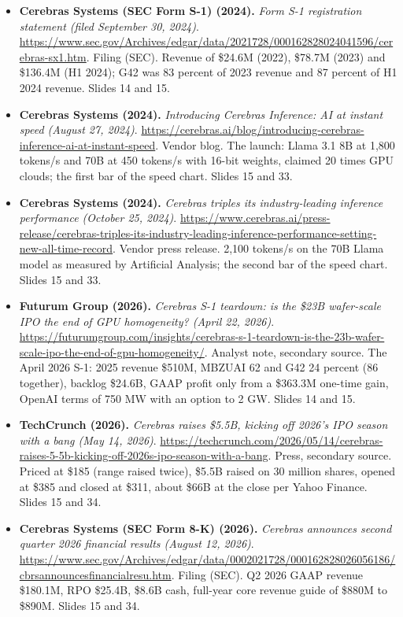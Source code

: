 \documentclass[11pt,letterpaper]{article}
\begin{document}
\begin{itemize}[leftmargin=1.2em,itemsep=3pt]
\item \textbf{Cerebras Systems (SEC Form S-1) (2024).} \textit{Form S-1 registration statement (filed September 30, 2024)}. \url{https://www.sec.gov/Archives/edgar/data/2021728/000162828024041596/cerebras-sx1.htm}. Filing (SEC). Revenue of \$24.6M (2022), \$78.7M (2023) and \$136.4M (H1 2024); G42 was 83 percent of 2023 revenue and 87 percent of H1 2024 revenue. Slides 14 and 15.
\item \textbf{Cerebras Systems (2024).} \textit{Introducing Cerebras Inference: AI at instant speed (August 27, 2024)}. \url{https://cerebras.ai/blog/introducing-cerebras-inference-ai-at-instant-speed}. Vendor blog. The launch: Llama 3.1 8B at 1,800 tokens/s and 70B at 450 tokens/s with 16-bit weights, claimed 20 times GPU clouds; the first bar of the speed chart. Slides 15 and 33.
\item \textbf{Cerebras Systems (2024).} \textit{Cerebras triples its industry-leading inference performance (October 25, 2024)}. \url{https://www.cerebras.ai/press-release/cerebras-triples-its-industry-leading-inference-performance-setting-new-all-time-record}. Vendor press release. 2,100 tokens/s on the 70B Llama model as measured by Artificial Analysis; the second bar of the speed chart. Slides 15 and 33.
\item \textbf{Futurum Group (2026).} \textit{Cerebras S-1 teardown: is the \$23B wafer-scale IPO the end of GPU homogeneity? (April 22, 2026)}. \url{https://futurumgroup.com/insights/cerebras-s-1-teardown-is-the-23b-wafer-scale-ipo-the-end-of-gpu-homogeneity/}. Analyst note, secondary source. The April 2026 S-1: 2025 revenue \$510M, MBZUAI 62 and G42 24 percent (86 together), backlog \$24.6B, GAAP profit only from a \$363.3M one-time gain, OpenAI terms of 750 MW with an option to 2 GW. Slides 14 and 15.
\item \textbf{TechCrunch (2026).} \textit{Cerebras raises \$5.5B, kicking off 2026's IPO season with a bang (May 14, 2026)}. \url{https://techcrunch.com/2026/05/14/cerebras-raises-5-5b-kicking-off-2026s-ipo-season-with-a-bang}. Press, secondary source. Priced at \$185 (range raised twice), \$5.5B raised on 30 million shares, opened at \$385 and closed at \$311, about \$66B at the close per Yahoo Finance. Slides 15 and 34.
\item \textbf{Cerebras Systems (SEC Form 8-K) (2026).} \textit{Cerebras announces second quarter 2026 financial results (August 12, 2026)}. \url{https://www.sec.gov/Archives/edgar/data/0002021728/000162828026056186/cbrsannouncesfinancialresu.htm}. Filing (SEC). Q2 2026 GAAP revenue \$180.1M, RPO \$25.4B, \$8.6B cash, full-year core revenue guide of \$880M to \$890M. Slides 15 and 34.

\end{itemize}
\end{document}
